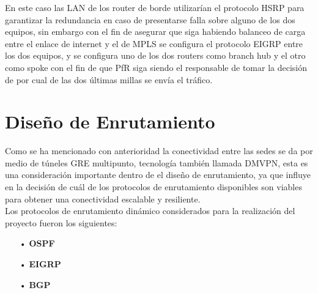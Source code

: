 En este caso las LAN de los router de borde utilizarían el protocolo HSRP para garantizar la redundancia en caso de presentarse falla sobre alguno de los dos equipos, sin embargo con el fin de asegurar que siga habiendo balanceo de carga entre el enlace de internet y el de MPLS se configura el protocolo EIGRP entre los dos equipos, y se configura uno de los dos routers como branch hub y el otro como spoke con el fin de que PfR siga siendo el responsable de tomar la decisión de por cual de las dos últimas millas se envía el tráfico.

\section{Diseño de Enrutamiento} %
\label{sec:Diseño de Enrutamiento}


Como se ha mencionado con anterioridad la conectividad entre las sedes se da por medio de túneles GRE multipunto, tecnología también llamada DMVPN, esta es una consideración importante dentro de el diseño de enrutamiento, ya que influye en la decisión de cuál de los protocolos de enrutamiento disponibles son viables para obtener una conectividad escalable y resiliente.
\\
Los protocolos de enrutamiento dinámico considerados para la realización del proyecto fueron los siguientes:

\begin{itemize}
\item[•]\textbf{OSPF}
\item[•]\textbf{EIGRP}
\item[•]\textbf{BGP}
\end{itemize}

